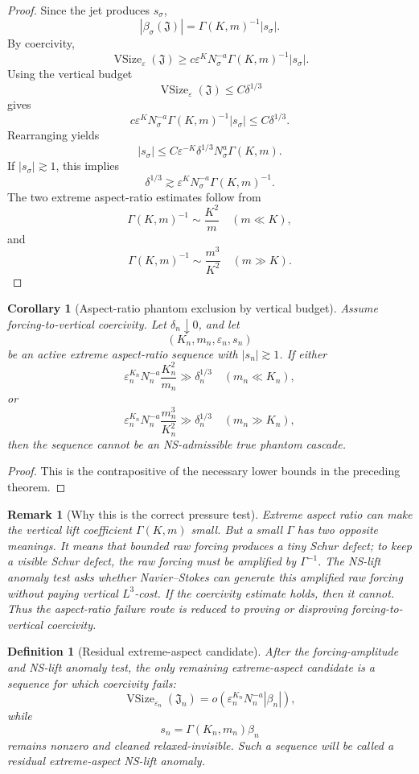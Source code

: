 \documentclass[11pt]{article}
\numberwithin{equation}{section}
\newtheorem{corollary}[theorem]{Corollary}
\newtheorem{definition}[theorem]{Definition}
\newtheorem{remark}[theorem]{Remark}
\begin{document}
\begin{proof}
Since the jet produces \(s_\sigma\),
\[
|\beta_\sigma(\mathfrak J)| =
\Gamma(K,m)^{-1}|s_\sigma|.
\]
By coercivity,
\[
\operatorname{VSize}_\varepsilon(\mathfrak J)
\ge
c\varepsilon^K N_\sigma^{-a}
\Gamma(K,m)^{-1}|s_\sigma|.
\]
Using the vertical budget
\[
\operatorname{VSize}_\varepsilon(\mathfrak J)
\le
C\delta^{1/3}
\]
gives
\[
c\varepsilon^K N_\sigma^{-a}
\Gamma(K,m)^{-1}|s_\sigma|
\le
C\delta^{1/3}.
\]
Rearranging yields
\[
|s_\sigma|
\le
C\varepsilon^{-K}\delta^{1/3}N_\sigma^a\Gamma(K,m).
\]
If \(|s_\sigma|\gtrsim1\), this implies
\[
\delta^{1/3}
\gtrsim
\varepsilon^K N_\sigma^{-a}\Gamma(K,m)^{-1}.
\]
The two extreme aspect-ratio estimates follow from
\[
\Gamma(K,m)^{-1}
\sim
\frac{K^2}{m}
\quad(m\ll K),
\]
and
\[
\Gamma(K,m)^{-1}
\sim
\frac{m^3}{K^2}
\quad(m\gg K).
\]
\end{proof}

\begin{corollary}[Aspect-ratio phantom exclusion by vertical budget]
Assume forcing-to-vertical coercivity. Let \(\delta_n\downarrow0\), and let
\[
(K_n,m_n,\varepsilon_n,s_n)
\]
be an active extreme aspect-ratio sequence with \(|s_n|\gtrsim1\). If either
\[
\varepsilon_n^{K_n}N_n^{-a}\frac{K_n^2}{m_n}
\gg
\delta_n^{1/3}
\quad
(m_n\ll K_n),
\]
or
\[
\varepsilon_n^{K_n}N_n^{-a}\frac{m_n^3}{K_n^2}
\gg
\delta_n^{1/3}
\quad
(m_n\gg K_n),
\]
then the sequence cannot be an NS-admissible true phantom cascade.
\end{corollary}

\begin{proof}
This is the contrapositive of the necessary lower bounds in the preceding theorem.
\end{proof}

\begin{remark}[Why this is the correct pressure test]
Extreme aspect ratio can make the vertical lift coefficient \(\Gamma(K,m)\) small. But a small \(\Gamma\) has two opposite meanings. It means that bounded raw forcing produces a tiny Schur defect; to keep a visible Schur defect, the raw forcing must be amplified by \(\Gamma^{-1}\). The NS-lift anomaly test asks whether Navier--Stokes can generate this amplified raw forcing without paying vertical \(L^3\)-cost. If the coercivity estimate holds, then it cannot. Thus the aspect-ratio failure route is reduced to proving or disproving forcing-to-vertical coercivity.
\end{remark}

\begin{definition}[Residual extreme-aspect candidate]
After the forcing-amplitude and NS-lift anomaly test, the only remaining extreme-aspect candidate is a sequence for which coercivity fails:
\[
\operatorname{VSize}_{\varepsilon_n}(\mathfrak J_n) =
o\left(
\varepsilon_n^{K_n}
N_n^{-a}
|\beta_n|
\right),
\]
while
\[
s_n=\Gamma(K_n,m_n)\beta_n
\]
remains nonzero and cleaned relaxed-invisible. Such a sequence will be called a residual extreme-aspect NS-lift anomaly.
\end{definition}
\end{document}
